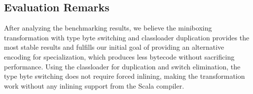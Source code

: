 \subsection{Evaluation Remarks}
\label{mbox:subsec-eval-remarks}

After analyzing the benchmarking results, we believe the miniboxing transformation with type byte switching and classloader duplication provides the most stable results and fulfills our initial goal of providing an alternative encoding for specialization, which produces less bytecode without sacrificing performance. Using the classloader for duplication and switch elimination, the type byte switching does not require forced inlining, making the transformation work without any inlining support from the Scala compiler.
